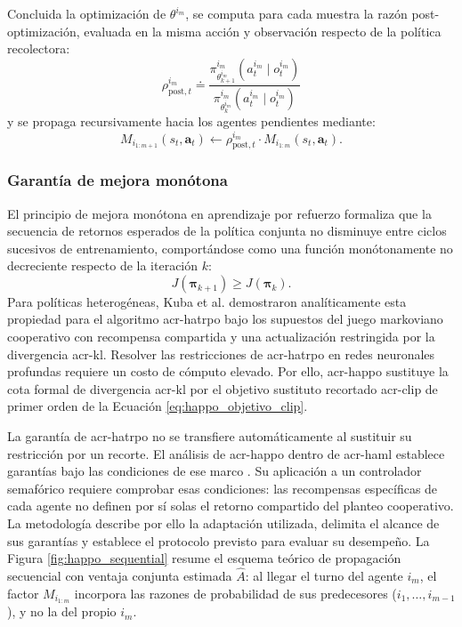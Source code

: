 Concluida la optimización de $\theta^{i_m}$, se computa para cada muestra la razón post-optimización, evaluada en la misma acción y observación respecto de la política recolectora:
\begin{equation}
    \rho_{\text{post},t}^{i_m} \doteq \frac{\pi_{\theta_{k+1}^{i_m}}^{i_m}(a_t^{i_m} \mid o_t^{i_m})}{\pi_{\theta_k^{i_m}}^{i_m}(a_t^{i_m} \mid o_t^{i_m})}
    \label{eq:happo_rho_post}
\end{equation}
y se propaga recursivamente hacia los agentes pendientes mediante:
\begin{equation}
    M_{i_{1:m+1}}(s_t, \mathbf{a}_t) \leftarrow \rho_{\text{post},t}^{i_m} \cdot M_{i_{1:m}}(s_t, \mathbf{a}_t).
    \label{eq:happo_actualizacion_recursiva}
\end{equation}

\subsubsection{Garantía de mejora monótona}

El principio de mejora monótona en aprendizaje por refuerzo formaliza que la secuencia de retornos esperados de la política conjunta no disminuye entre ciclos sucesivos de entrenamiento, comportándose como una función monótonamente no decreciente respecto de la iteración $k$:
\begin{equation}
    J(\boldsymbol{\pi}_{k+1}) \ge J(\boldsymbol{\pi}_k).
    \label{eq:garantia_happo}
\end{equation}
Para políticas heterogéneas, Kuba et al. \cite{kuba2021trust} demostraron analíticamente esta propiedad para el algoritmo \gls{acr-hatrpo} bajo los supuestos del juego markoviano cooperativo con recompensa compartida y una actualización restringida por la divergencia \acrshort{acr-kl}. Resolver las restricciones de \acrshort{acr-hatrpo} en redes neuronales profundas requiere un costo de cómputo elevado. Por ello, \acrshort{acr-happo} sustituye la cota formal de divergencia \acrshort{acr-kl} por el objetivo sustituto recortado \acrshort{acr-clip} de primer orden de la Ecuación \eqref{eq:happo_objetivo_clip}.

La garantía de \acrshort{acr-hatrpo} no se transfiere automáticamente al sustituir su restricción por un recorte. El análisis de \acrshort{acr-happo} dentro de \acrshort{acr-haml} establece garantías bajo las condiciones de ese marco \cite{kuba2021trust,zhong2024heterogeneous}. Su aplicación a un controlador semafórico requiere comprobar esas condiciones: las recompensas específicas de cada agente no definen por sí solas el retorno compartido del planteo cooperativo. La metodología describe por ello la adaptación utilizada, delimita el alcance de sus garantías y establece el protocolo previsto para evaluar su desempeño. La Figura \ref{fig:happo_sequential} resume el esquema teórico de propagación secuencial con ventaja conjunta estimada $\hat{A}$: al llegar el turno del agente $i_m$, el factor $M_{i_{1:m}}$ incorpora las razones de probabilidad de sus predecesores ($i_1,\dots,i_{m-1}$), y no la del propio $i_m$.

